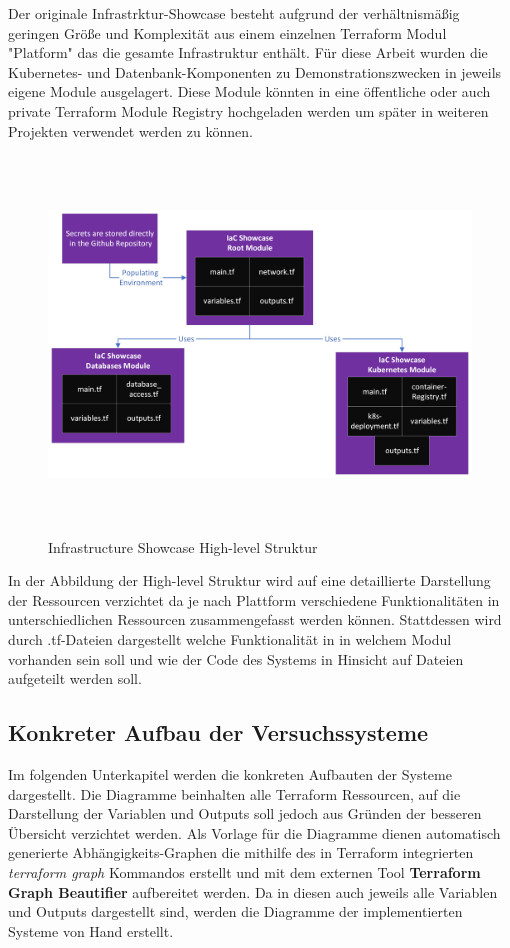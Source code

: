 Der originale Infrastrktur-Showcase besteht aufgrund der verhältnismäßig
geringen Größe und Komplexität aus einem einzelnen Terraform Modul
"Platform" das die gesamte Infrastruktur enthält. Für diese Arbeit wurden
die Kubernetes- und Datenbank-Komponenten zu Demonstrationszwecken in
jeweils eigene Module ausgelagert. Diese Module könnten in
eine öffentliche oder auch private Terraform Module Registry
hochgeladen werden um später in weiteren Projekten verwendet werden zu
können.

\begin{figure}[H]
  \includegraphics[keepaspectratio, height=10cm]{fig/hauptteil/IaC_Showcase_Structure_High-level.png}
  \caption{Infrastructure Showcase High-level Struktur}
  \centering
\end{figure}

In der Abbildung der High-level Struktur wird auf eine detaillierte
Darstellung der Ressourcen verzichtet da je nach Plattform verschiedene
Funktionalitäten in unterschiedlichen Ressourcen zusammengefasst werden
können. Stattdessen wird durch .tf-Dateien dargestellt welche
Funktionalität in in welchem Modul vorhanden sein soll und wie der Code
des Systems in Hinsicht auf Dateien aufgeteilt werden soll.

\subsection{Konkreter Aufbau der Versuchssysteme}

Im folgenden Unterkapitel werden die konkreten Aufbauten der Systeme
dargestellt. Die Diagramme beinhalten alle Terraform Ressourcen, auf
die Darstellung der Variablen und Outputs soll jedoch aus Gründen der
besseren Übersicht verzichtet werden. Als Vorlage für die Diagramme
dienen automatisch generierte Abhängigkeits-Graphen die mithilfe
des in Terraform integrierten \textit{terraform graph} Kommandos
erstellt und mit dem externen Tool \textbf{Terraform Graph Beautifier}
aufbereitet werden. Da in diesen auch jeweils alle Variablen und
Outputs dargestellt sind, werden die Diagramme der implementierten
Systeme von Hand erstellt.

